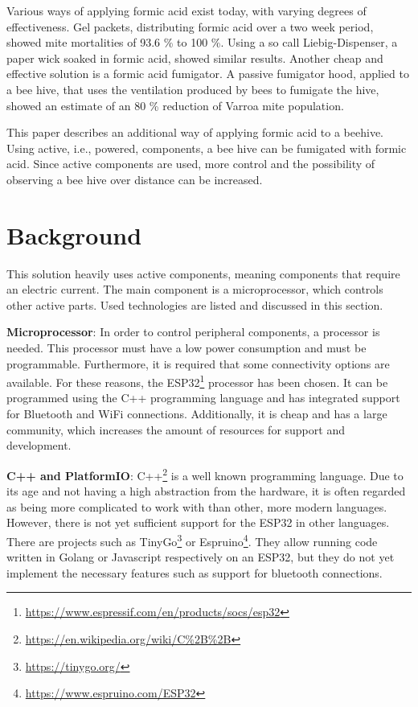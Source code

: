 \documentclass[11pt]{article}
\begin{document}
    Various ways of applying formic acid exist today, with varying degrees of effectiveness.
    Gel packets, distributing formic acid over a two week period, showed mite mortalities of 93.6 \% to 100 \%\cite{FormicAcidBasedTreatments}.
    Using a so call Liebig-Dispenser, a paper wick soaked in formic acid, showed similar results\cite{FormicAcidBasedTreatments}.
    Another cheap and effective solution is a formic acid fumigator\cite{FormicAcidFumigator}.
    A passive fumigator hood, applied to a bee hive, that uses the ventilation produced by bees to fumigate the hive, showed an estimate of an 80 \% reduction of Varroa mite population.

    This paper describes an additional way of applying formic acid to a beehive.
    Using active, i.e., powered, components, a bee hive can be fumigated with formic acid.
    Since active components are used, more control and the possibility of observing a bee hive over distance can be increased.

    \section{Background}\label{sec:background}

    This solution heavily uses active components, meaning components that require an electric current.
    The main component is a microprocessor, which controls other active parts.
    Used technologies are listed and discussed in this section.

    \textbf{Microprocessor}: In order to control peripheral components, a processor is needed.
    This processor must have a low power consumption and must be programmable.
    Furthermore, it is required that some connectivity options are available.
    For these reasons, the ESP32\footnote{\url{https://www.espressif.com/en/products/socs/esp32}} processor has been chosen.
    It can be programmed using the C++ programming language and has integrated support for Bluetooth and WiFi connections.
    Additionally, it is cheap and has a large community, which increases the amount of resources for support and development.

    \textbf{C++ and PlatformIO}: C++\footnote{\url{https://en.wikipedia.org/wiki/C\%2B\%2B}} is a well known programming language.
    Due to its age and not having a high abstraction from the hardware, it is often regarded as being more complicated to work with than other, more modern languages.
    However, there is not yet sufficient support for the ESP32 in other languages.
    There are projects such as TinyGo\footnote{\url{https://tinygo.org/}} or Espruino\footnote{\url{https://www.espruino.com/ESP32}}.
    They allow running code written in Golang or Javascript respectively on an ESP32, but they do not yet implement the necessary features such as support for bluetooth connections.
\end{document}
